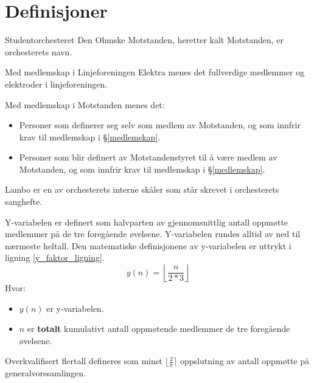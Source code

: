 \section{Definisjoner}

\begin{definition}
    Studentorchesteret Den Ohmske Motstanden, heretter kalt Motstanden, er orchesterets navn.
\end{definition}

\begin{definition}
    Med medlemskap i Linjeforeningen Elektra menes det fullverdige medlemmer og elektroder i linjeforeningen.
\end{definition}

\begin{definition}
    Med medlemskap i Motstanden menes det: 
    \begin{itemize}
        \item Personer som definerer seg selv som medlem av Motstanden, og som innfrir krav til medlemskap i
        \S\hspace{3pt}\ref{medlemskap}.
        \item Personer som blir definert av Motstandenstyret til å være medlem av Motstanden, og som innfrir krav til medlemskap i \S\hspace{3pt}\ref{medlemskap}.
    \end{itemize}
\end{definition}

\begin{definition}
    Lambo er en av orchesterets interne skåler som står skrevet i orchesterets sanghefte.
\end{definition}

\begin{definition}[\label{y_faktor_paragraf}]
    Y-variabelen er definert som halvparten av gjennomsnittlig antall oppmøtte medlemmer på de tre foregående øvelsene. Y-variabelen rundes alltid av ned til nærmeste heltall. Den matematiske definisjonene av y-variabelen er uttrykt i ligning \ref{y_faktor_ligning}.
    \begin{equation}\label{y_faktor_ligning}
        y(n) = \left\lfloor \frac{n}{2*3} \right\rfloor
    \end{equation}
    Hvor:
    \begin{itemize}
        \item $y(n)$ er y-variabelen.
        \item $n$ er \textbf{totalt} kumulativt antall oppmøtende medlemmer de tre foregående øvelsene. 
    \end{itemize}
\end{definition}

\begin{definition}[\label{overkvalifisert_flertall}]
    Overkvalifisert flertall defineres som minst $\lfloor\frac{2}{\pi}\rceil$ oppslutning av antall oppmøtte på generalvorssamlingen.
\end{definition}